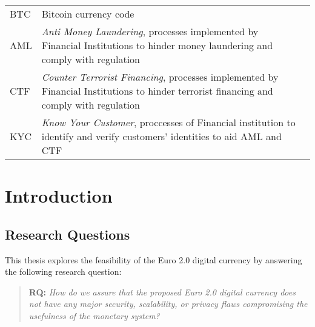 \documentclass[12pt]{article} %
\begin{document}
\begin{tabular}{p{3 cm}ll} %
BTC & Bitcoin currency code\\
AML & \textit{Anti Money Laundering}, processes implemented by Financial Institutions to hinder money laundering and comply with regulation\\
CTF & \textit{Counter Terrorist Financing}, processes implemented by Financial Institutions to hinder terrorist financing and comply with regulation\\
KYC & \textit{Know Your Customer}, proccesses of Financial institution to identify and verify customers' identities to aid AML and CTF
\end{tabular}


\pagebreak

\tableofcontents
\newpage

\listoffigures
\pagebreak

\listoftables
\pagebreak

\section{Introduction}
\label{Introduction}




\subsection{Research Questions}

This thesis explores the feasibility of the Euro 2.0 digital currency by answering the following research question:
\begin{quotation}
	\textbf{RQ: }\textit{How do we assure that the proposed Euro 2.0 digital currency does not have any major security, scalability, or privacy flaws compromising the usefulness of the monetary system?}
\end{quotation}
\end{document}
